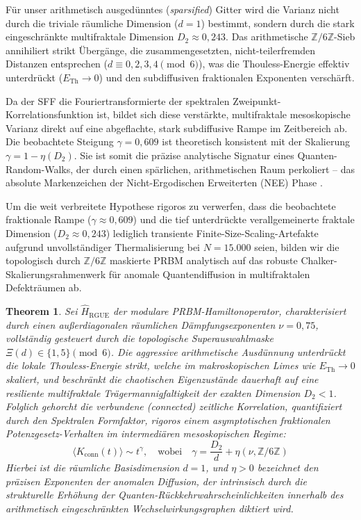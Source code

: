 \documentclass[aps,prl,preprint,superscriptaddress,floatfix]{revtex4-2}
\newtheorem{theorem}{Theorem}[section]
\newcommand{\Zmod}{\mathbb{Z}/6\mathbb{Z}}
\begin{document}
Für unser arithmetisch ausgedünntes (\textit{sparsified}) Gitter wird die Varianz nicht durch die triviale räumliche Dimension ($d=1$) bestimmt, sondern durch die stark eingeschränkte multifraktale Dimension $D_2 \approx 0,243$. Das arithmetische $\Zmod$-Sieb annihiliert strikt Übergänge, die zusammengesetzten, nicht-teilerfremden Distanzen entsprechen ($d \equiv 0, 2, 3, 4 \pmod 6$), was die Thouless-Energie effektiv unterdrückt ($E_{\text{Th}} \to 0$) und den subdiffusiven fraktionalen Exponenten verschärft.

Da der SFF die Fouriertransformierte der spektralen Zweipunkt-Korrelationsfunktion ist, bildet sich diese verstärkte, multifraktale mesoskopische Varianz direkt auf eine abgeflachte, stark subdiffusive Rampe im Zeitbereich ab. Die beobachtete Steigung $\gamma = 0,609$ ist theoretisch konsistent mit der Skalierung $\gamma = 1 - \eta(D_2)$. Sie ist somit die präzise analytische Signatur eines Quanten-Random-Walks, der durch einen spärlichen, arithmetischen Raum perkoliert – das absolute Markenzeichen der Nicht-Ergodischen Erweiterten (NEE) Phase \cite{Kravtsov2015, Khaymovich2020, GarciaGarcia2024}.

Um die weit verbreitete Hypothese rigoros zu verwerfen, dass die beobachtete fraktionale Rampe ($\gamma \approx 0,609$) und die tief unterdrückte verallgemeinerte fraktale Dimension ($D_2 \approx 0,243$) lediglich transiente Finite-Size-Scaling-Artefakte aufgrund unvollständiger Thermalisierung bei $N=15.000$ seien, bilden wir die topologisch durch $\Zmod$ maskierte PRBM analytisch auf das robuste Chalker-Skalierungsrahmenwerk für anomale Quantendiffusion in multifraktalen Defekträumen ab.

\begin{theorem}
\label{thm:anomalous_diffusion_sff}
Sei $\hat{H}_{\text{RGUE}}$ der modulare PRBM-Hamiltonoperator, charakterisiert durch einen außerdiagonalen räumlichen Dämpfungsexponenten $\nu = 0,75$, vollständig gesteuert durch die topologische Superauswahlmaske $\Xi(d) \in \{1,5\} \pmod 6$. Die aggressive arithmetische Ausdünnung unterdrückt die lokale Thouless-Energie strikt, welche im makroskopischen Limes wie $E_{\text{Th}} \to 0$ skaliert, und beschränkt die chaotischen Eigenzustände dauerhaft auf eine resiliente multifraktale Trägermannigfaltigkeit der exakten Dimension $D_2 < 1$. Folglich gehorcht die verbundene (\textit{connected}) zeitliche Korrelation, quantifiziert durch den Spektralen Formfaktor, rigoros einem asymptotischen fraktionalen Potenzgesetz-Verhalten im intermediären mesoskopischen Regime:
\begin{equation}
\langle K_{\text{conn}}(t) \rangle \sim t^{\gamma}, \quad \text{wobei} \quad \gamma = \frac{D_2}{d} + \eta(\nu, \Zmod)
\end{equation}
Hierbei ist die räumliche Basisdimension $d=1$, und $\eta > 0$ bezeichnet den präzisen Exponenten der anomalen Diffusion, der intrinsisch durch die strukturelle Erhöhung der Quanten-Rückkehrwahrscheinlichkeiten innerhalb des arithmetisch eingeschränkten Wechselwirkungsgraphen diktiert wird.
\end{theorem}
\end{document}
